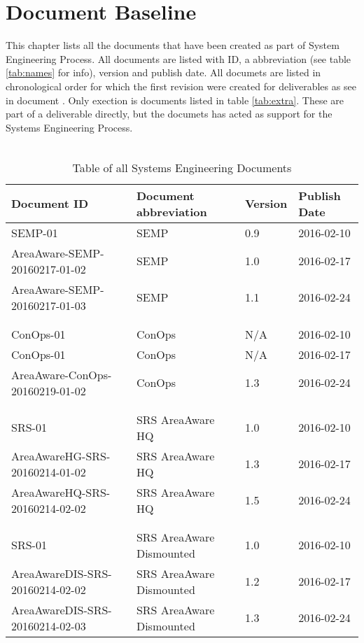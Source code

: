 %
\thispagestyle{fancy}
\chapter{Document Baseline}
\label{chp:baseline}
This chapter lists all the documents that have been created as part of System Engineering Process.
All documents are listed with ID, a abbreviation (see table \ref{tab:names} for info), version and publish date.
All documets are listed in chronological order for which the first revision were created for deliverables as see in document \semp.
Only exection is documents listed in table \ref{tab:extra}. These are part of a deliverable directly, but the documets has acted as support for the Systems Engineering Process.\\\\


\begin{table}[h]
    \centering
    \label{tab:baseline1}
    \begin{tabular}{llll}
    \textbf{Document ID} & \textbf{Document abbreviation} & \textbf{Version} & \textbf{Publish Date} \\ \hline
    SEMP-01 & SEMP & 0.9 & 2016-02-10 \\ \hline
    AreaAware-SEMP-20160217-01-02 & SEMP & 1.0 & 2016-02-17 \\ \hline
    AreaAware-SEMP-20160217-01-03 & SEMP & 1.1 & 2016-02-24 \\ \hline
    &  &  &  \\
    &  &  &  \\
    ConOps-01 & ConOps & N/A & 2016-02-10 \\ \hline
    ConOps-01 & ConOps & N/A & 2016-02-17\\ \hline
    AreaAware-ConOps-20160219-01-02 & ConOps & 1.3 & 2016-02-24\\ \hline
    &  &  &  \\
    &  &  &  \\
    SRS-01 & SRS AreaAware HQ & 1.0 & 2016-02-10 \\ \hline
    AreaAwareHG-SRS-20160214-01-02 & SRS AreaAware HQ & 1.3 & 2016-02-17 \\ \hline
    AreaAwareHQ-SRS-20160214-02-02 & SRS AreaAware HQ & 1.5 & 2016-02-24 \\ \hline
    &  &  &  \\
    &  &  &  \\
    SRS-01 & SRS AreaAware Dismounted & 1.0 & 2016-02-10 \\ \hline
    AreaAwareDIS-SRS-20160214-02-02 & SRS AreaAware Dismounted & 1.2 & 2016-02-17 \\ \hline
    AreaAwareDIS-SRS-20160214-02-03 & SRS AreaAware Dismounted & 1.3 & 2016-02-24 \\ \hline
    \end{tabular}
    \caption{Table of all Systems Engineering Documents}
\end{table}



